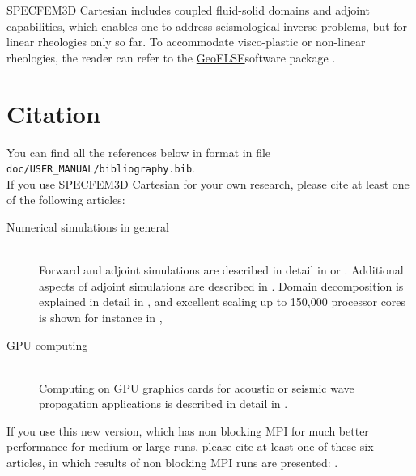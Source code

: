 SPECFEM3D Cartesian includes coupled fluid-solid domains and adjoint
capabilities, which enables one to address seismological inverse problems,
but for linear rheologies only so far. To accommodate visco-plastic
or non-linear rheologies, the reader can refer to the \href{http://geoelse.stru.polimi.it/}{GeoELSE}software
package \citep{CaGa97,StPaIg09}.


\section{Citation}

You can find all the references below in \BibTeX format in file \texttt{doc/USER\_MANUAL/bibliography.bib}.\\

If you use SPECFEM3D Cartesian for your own research, please cite
at least one of the following articles:
\begin{description}
\item [{Numerical simulations in general}] ~\\
 Forward and adjoint simulations are described in detail in \citet{TrKoLi08,PeKoLuMaLeCaLeMaLiBlNiBaTr11,VaCaSaKoVi99,KoMiEr09,KoErGoMi10,ChKoViCaVaFe07,MaKoDi09,KoViCh10,CaKoLaTiMiLeSnTr08,TrKoHjLiZhPeBoMcFrTrHu10,KoRiTr02,KoTr02a,KoTr02b,KoTr99}
or \citet{KoVi98}. Additional aspects of adjoint simulations are
described in \citet{TrTaLi05,LiTr06,TrKoLi08,LiTr08,TrKoHjLiZhPeBoMcFrTrHu10,PeKoLuMaLeCaLeMaLiBlNiBaTr11}.
Domain decomposition is explained in detail in \citet{MaKoBlLe08},
and excellent scaling up to 150,000 processor cores is shown for instance
in \citet{CaKoLaTiMiLeSnTr08,KoLaMi08a,MaKoBlLe08,KoErGoMi10,Kom11},
\item [{GPU computing}] ~\\
 Computing on GPU graphics cards for acoustic or seismic wave propagation
applications is described in detail in \citet{Kom11,MiKo10,KoMiEr09,KoErGoMi10}.
\end{description}
\noindent If you use this new version, which has non blocking
MPI for much better performance for medium or large runs, please cite
at least one of these six articles, in which results of non blocking
MPI runs are presented: \citet{PeKoLuMaLeCaLeMaLiBlNiBaTr11,KoErGoMi10,KoViCh10,Kom11,CaKoLaTiMiLeSnTr08,MaKoBlLe08}.\\

